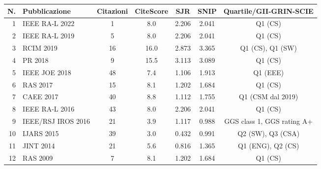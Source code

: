 \documentclass[11pt]{article}
\begin{document}
{\footnotesize
\begin{table}[!ht]
  \centering
  \begin{tabular}{|r|l|c|c|c|c|c|}
  \hline
  N. & Pubblicazione                             & Citazioni & CiteScore & SJR   & SNIP & Quartile/GII-GRIN-SCIE \\
  \hline
    1 &\cite{lodirizzini2022ral} IEEE RA-L 2022  &   1       &  8.0      & 2.206 & 2.041 & Q1 (CS) \\
    2 &\cite{lodirizzini2019ral} IEEE RA-L 2019  &   5       &  8.0      & 2.206 & 2.041 & Q1 (CS) \\
    3 &\cite{galasso2019rcim} RCIM 2019          &  16       & 16.0      & 2.873 & 3.365 & Q1 (CS), Q1 (SW) \\
    4 &\cite{lodirizzini2018pr} PR 2018          &   9       & 15.5      & 3.113 & 3.089 & Q1 (CS) \\
    5 &\cite{simetti2018joe} IEEE JOE 2018       &  48       &  7.4      & 1.106 & 1.913 & Q1 (EEE) \\
    6 &\cite{kallasi2017ras} RAS 2017            &  15       &  8.1      & 1.202 & 1.684 & Q1 (CS) \\
    7 &\cite{lodirizzini2017caee} CAEE 2017      &  40       &  8.8      & 1.112 & 1.755 & Q1 (CSM dal 2019) \\
    8 &\cite{kallasi2016ral} IEEE RA-L 2016      &  43       &  8.0      & 2.206 & 2.041 & Q1 (CS) \\
    9 &\cite{kallasi2016iros} IEEE/RSJ IROS 2016 &  21       &  3.9      & 1.117 & 0.988 & GGS class 1, GGS rating A+ \\
   10 &\cite{lodirizzini2015ijars} IJARS 2015    &  39       &  3.0      & 0.432 & 0.991 & Q2 (SW), Q3 (CSA) \\
   11 &\cite{aleotti2014jirs} JINT 2014          &  21       &  5.6      & 0.816 & 1.365 & Q1 (ENG), Q2 (CS) \\
   12 &\cite{lodirizzini2009ras} RAS 2009        &   7       &  8.1      & 1.202 & 1.684 & Q1 (CS) \\
  \hline
  \end{tabular}
\end{table}
}
\end{document}
